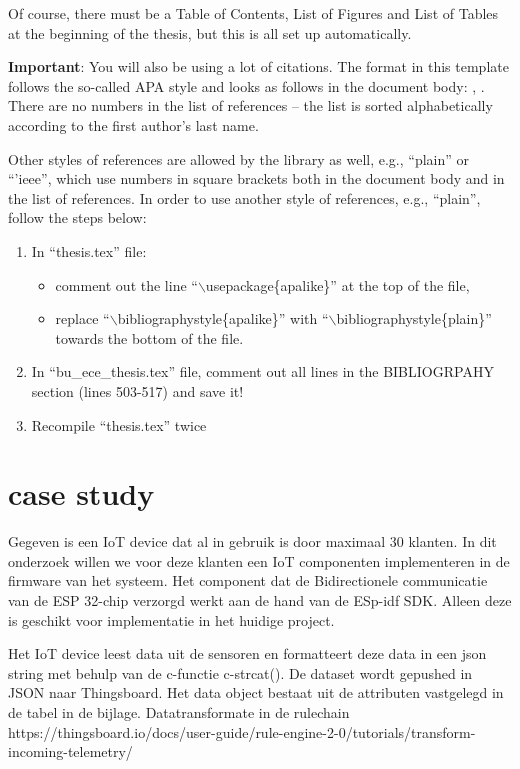 Of course, there must be a Table of Contents, List of Figures and List of Tables at the beginning of the thesis, but this is all set up automatically.

{\bf Important}: You will also be using a lot of citations. The format in this template follows the so-called APA style and looks as follows in the document body: \cite{lamport1985:latex}, \cite{Debr01}. There are no numbers in the list of references -- the list is sorted alphabetically according to the first author's last name.

Other styles of references are allowed by the library as well, e.g., ``plain'' or ``'ieee'', which use numbers in square brackets both in the document body and in the list of references. In order to use another style of references, e.g., ``plain'', follow the steps below:
%
\begin{enumerate}
  \item In ``thesis.tex'' file:
	\begin{itemize}
	  \item comment out the line ``$\backslash$usepackage\{apalike\}'' at the top of the file,
	  \item replace ``$\backslash$bibliographystyle\{apalike\}'' with ``$\backslash$bibliographystyle\{plain\}'' towards the bottom of the file.
	\end{itemize}
  \item In ``bu\_ece\_thesis.tex'' file, comment out all lines in the BIBLIOGRPAHY section (lines 503-517) and save it!
  \item Recompile ``thesis.tex'' twice
\end{enumerate}

 

\section{case study}

Gegeven is een IoT device dat al in gebruik is door maximaal 30 klanten. In dit onderzoek willen we voor deze klanten een IoT componenten implementeren in de firmware van het systeem. Het component dat de Bidirectionele communicatie van de ESP 32-chip verzorgd werkt aan de hand van de ESp-idf SDK. Alleen deze is geschikt voor implementatie in het huidige project.   



Het IoT device leest data uit de sensoren en formatteert deze data in een json string met behulp van de c-functie c-strcat(). De dataset wordt gepushed in JSON naar Thingsboard. Het data object bestaat uit de attributen vastgelegd in de tabel in de bijlage.
Datatransformate in de rulechain
https://thingsboard.io/docs/user-guide/rule-engine-2-0/tutorials/transform-incoming-telemetry/ 


